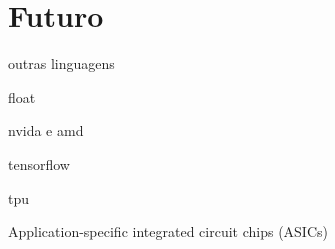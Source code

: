 \chapter{Futuro}
\label{cap:futuro}

outras linguagens

float

nvida e amd

tensorflow

tpu

Application-specific integrated circuit chips (ASICs)
